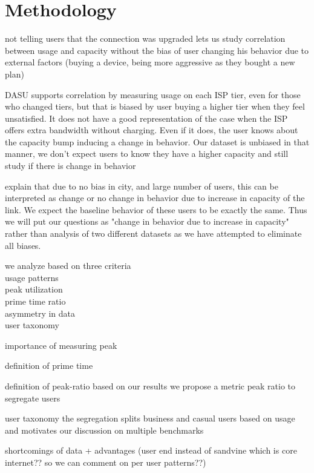 \section{Methodology}
\label{sec:methodology}



not telling users that the connection was upgraded lets us study correlation between usage and capacity without the bias of user changing his behavior due to external factors (buying a device, being more aggressive as they bought a new plan)


DASU supports correlation by measuring usage on each ISP tier, even for those who changed tiers, but that is biased by user buying a higher tier when they feel unsatisfied. It does not have a good representation of the case when the ISP offers extra bandwidth without charging. Even if it does, the user knows about the capacity bump inducing a change in behavior. Our dataset is unbiased in that manner, we don't expect users to know they have a higher capacity and still study if there is change in behavior


 explain that due to no bias in city, and large number of users, this can be interpreted as change or no change in behavior due to increase in capacity of the link. We expect the baseline behavior of these users to be exactly the same. Thus we will put our questions as "change in behavior due to increase in capacity" rather than analysis of two different datasets as we have attempted to eliminate all biases.


we analyze based on three criteria\\
usage patterns\\
peak utilization\\
prime time ratio\\
asymmetry in data\\
user taxonomy



 importance of measuring peak

 definition of prime time

definition of peak-ratio
based on our results we propose a metric peak ratio to segregate users


 user taxonomy
 the segregation splits business and casual users based on usage and motivates our discussion on multiple benchmarks


 shortcomings of data + advantages (user end instead of sandvine which is core internet?? so we can comment on per user patterns??)